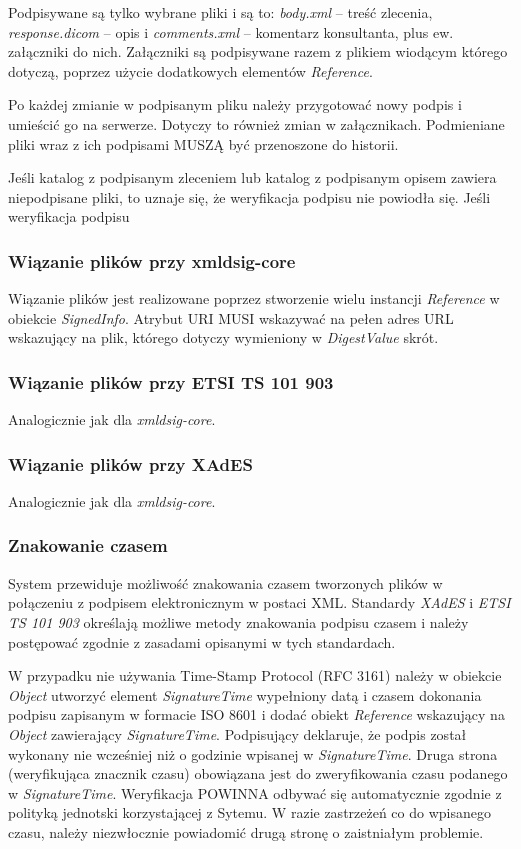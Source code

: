 \documentclass[a4paper]{article}
\begin{document}
Podpisywane są tylko wybrane pliki i są to: \emph{body.xml} -- treść zlecenia,
\emph{response.dicom} -- opis i \emph{comments.xml} -- komentarz konsultanta, plus ew.
załączniki do nich. Załączniki są podpisywane razem z plikiem wiodącym którego dotyczą,
poprzez użycie dodatkowych elementów \emph{Reference}.

Po każdej zmianie w podpisanym pliku należy przygotować nowy podpis i umieścić go na
serwerze. Dotyczy to również zmian w załącznikach. Podmieniane pliki wraz z ich podpisami
MUSZĄ być przenoszone do historii.

Jeśli katalog z podpisanym zleceniem lub katalog z podpisanym opisem zawiera niepodpisane
pliki, to uznaje się, że weryfikacja podpisu nie powiodła się. Jeśli weryfikacja podpisu 

\subsubsection{Wiązanie plików przy xmldsig-core}

Wiązanie plików jest realizowane poprzez stworzenie wielu instancji \emph{Reference} w
obiekcie \emph{SignedInfo}. Atrybut URI MUSI wskazywać na pełen adres URL wskazujący
na plik, którego dotyczy wymieniony w \emph{DigestValue} skrót.

\subsubsection{Wiązanie plików przy ETSI TS 101 903}

Analogicznie jak dla \emph{xmldsig-core}.

\subsubsection{Wiązanie plików przy XAdES}

Analogicznie jak dla \emph{xmldsig-core}.

\subsubsection{Znakowanie czasem}

System przewiduje możliwość znakowania czasem tworzonych plików w połączeniu z podpisem
elektronicznym w postaci XML. Standardy \textit{XAdES} i \textit{ETSI TS 101 903}
określają możliwe metody znakowania podpisu czasem i należy postępować zgodnie z zasadami
opisanymi w tych standardach. 

W przypadku nie używania Time-Stamp Protocol (RFC 3161) należy w obiekcie \emph{Object}
utworzyć element \emph{SignatureTime} wypełniony datą i czasem dokonania podpisu zapisanym w
formacie ISO 8601 i dodać obiekt \emph{Reference} wskazujący na \emph{Object} zawierający
\emph{SignatureTime}. Podpisujący deklaruje, że podpis został wykonany nie wcześniej niż o
godzinie wpisanej w \emph{SignatureTime}. Druga strona (weryfikująca znacznik czasu)
obowiązana jest do zweryfikowania czasu podanego w \emph{SignatureTime}. Weryfikacja
POWINNA odbywać się automatycznie zgodnie z polityką jednotski korzystającej z Sytemu. W
razie zastrzeżeń co do wpisanego czasu, należy niezwłocznie powiadomić drugą stronę o
zaistniałym problemie.
\end{document}
